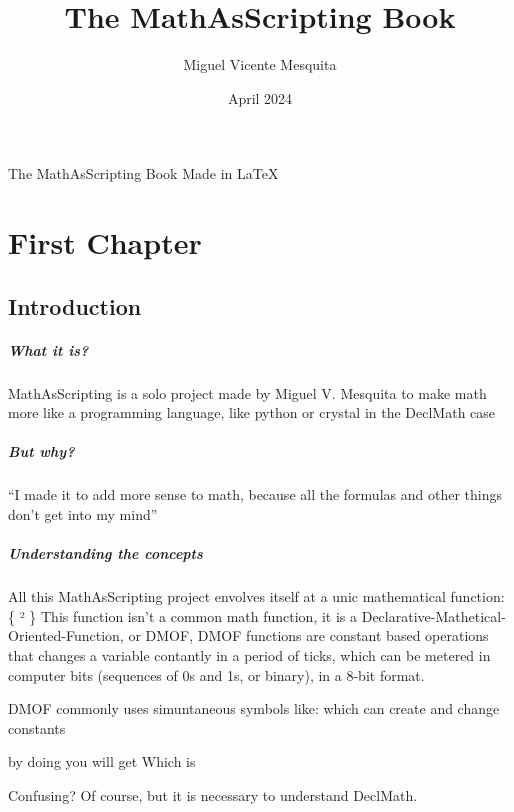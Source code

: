 \documentclass{book}
\title{The MathAsScripting Book}
\author{Miguel Vicente Mesquita}
\date{April 2024}
\begin{document}
\maketitle
The MathAsScripting Book
Made in \LaTeX{}

\newpage

\chapter{First Chapter}

\section{Introduction}

\paragraph{What it is?}
MathAsScripting is a solo project made by Miguel V. Mesquita to make math more
like a programming language, like python or crystal in the DeclMath case

\paragraph{But why?}
``I made it to add more sense to math, because all the formulas and other things don't get into my mind''

\paragraph{Understanding the concepts}
All this MathAsScripting project envolves itself at a unic mathematical function:
\{ \sum \longleftrightarrow \varDelta² \} 
This function isn't a common math function, it is a Declarative-Mathetical-Oriented-Function, or DMOF,
DMOF functions are constant based operations that changes a variable contantly in a period of ticks,
which can be metered in computer bits (sequences of 0s and 1s, or binary), in a 8-bit format.

DMOF commonly uses simuntaneous symbols like:
\Longleftrightarrow \longleftrightarrow \leftrightarrow \Leftrightarrow \Updownarrow \updownarrow \nleftrightarrow \nLeftrightarrow 
which can create and change constants

by doing
 \neq {} \div {}
you will get
 \eq \exp \leftrightsquigarrow {}
Which is
 \eq {} 

Confusing? Of course, but it is necessary to understand DeclMath.
\end{document}
